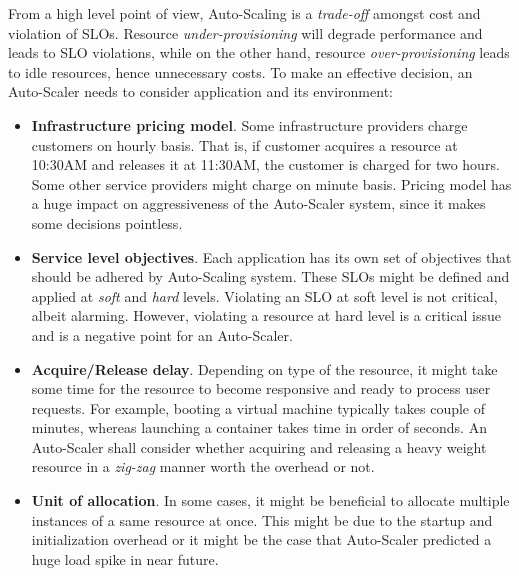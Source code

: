 From a high level point of view, Auto-Scaling is a \emph{trade-off} amongst cost and violation of SLOs. Resource \emph{under-provisioning} will degrade performance and leads to SLO violations, while on the other hand, resource \emph{over-provisioning} leads to idle resources, hence unnecessary costs. To make an effective decision, an Auto-Scaler needs to consider application and its environment:
\begin{itemize}
    \item \textbf{Infrastructure pricing model}. Some infrastructure providers charge customers on hourly basis. That is, if customer acquires a resource at 10:30AM and releases it at 11:30AM, the customer is charged for two hours. Some other service providers might charge on minute basis. Pricing model has a huge impact on aggressiveness of the Auto-Scaler system, since it makes some decisions pointless.
    \item \textbf{Service level objectives}. Each application has its own set of objectives that should be adhered by Auto-Scaling system. These SLOs might be defined and applied at \emph{soft} and \emph{hard} levels. Violating an SLO at soft level is not critical, albeit alarming. However, violating a resource at hard level is a critical issue and is a negative point for an Auto-Scaler.
    \item \textbf{Acquire/Release delay}. Depending on type of the resource, it might take some time for the resource to become responsive and ready to process user requests. For example, booting a virtual machine typically takes couple of minutes, whereas launching a container takes time in order of seconds. An Auto-Scaler shall consider whether acquiring and releasing a heavy weight resource in a \emph{zig-zag} manner worth the overhead or not.
    \item \textbf{Unit of allocation}. In some cases, it might be beneficial to allocate multiple instances of a same resource at once. This might be due to the startup and initialization overhead or it might be the case that Auto-Scaler predicted a huge load spike in near future.
\end{itemize}

